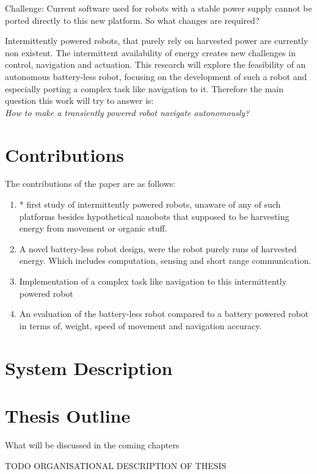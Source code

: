 Challenge:
Current software used for robots with a stable power supply cannot be ported directly to this new platform.
So what changes are required?

Intermittently powered robots, that purely rely on harvested power are currently non existent.
The intermittent availability of energy creates new challenges in control, navigation and actuation. 
This research will explore the feasibility of an autonomous battery-less robot, focusing on the development of such a robot and especially porting a complex task like navigation to it. 
Therefore the main question this work will try to answer is: \\
\textit{How to make a transiently powered robot navigate autonomously?}

\section{Contributions}

The contributions of the paper are as follows:

\begin{enumerate}

\item * first study of intermittently powered robots, unaware of any of such platforms besides hypothetical nanobots that supposed to be harvesting energy from movement or organic stuff.

\item A novel battery-less robot design, were the robot purely runs of harvested energy. Which includes computation, sensing and short range communication.

\item Implementation of a complex task like navigation to this intermittently powered robot

\item An evaluation of the battery-less robot compared to a battery powered robot in terms of, weight, speed of movement and navigation accuracy.
\end{enumerate}

\section{System Description}


\section{Thesis Outline}
What will be discussed in the coming chapters


\vspace{1\baselineskip}

\noindent
TODO ORGANISATIONAL DESCRIPTION OF THESIS

